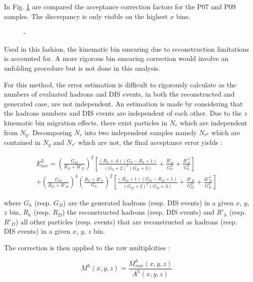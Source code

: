 In Fig. \ref{pic:AccPer} are compared the acceptance correction factors for the P07 and P09 samples. The discrepancy is only visible on the highest $x$ bins.

\begin{figure}
	\caption{-}
	\label{pic:AccPer}
\end{figure}

Used in this fashion, the kinematic bin smearing due to reconstruction limitations is accounted for. A more rigorous bin smearing correction would involve an unfolding procedure but is not done in this analysis.

For this method, the error estimation is difficult to rigorously calculate as the numbers of evaluated hadrons and DIS events, in both the reconstructed and generated case, are not independent. An estimation is made by considering that the hadrons numbers and DIS events are independent of each other. Due to the $z$ kinematic bin migration effects, there exist particles in $N_r$ which are independent from $N_g$. Decomposing $N_r$ into two independent samples namely $N_{r^0}$ which are contained in $N_g$ and $N_{r'}$ which are not, the final acceptance error yields :

\begin{equation}
  \begin{split}
    E^2_{acc} = \left (\frac{G_D}{R_D+R'_{D}}\right )^2\left [\frac{(R_h+A)(G_h-R_h+1)}{(G_h+2)^2(G_D+3)}+\frac{R'_{h}}{G^2_h}+\frac{R'^2_h}{G^3_h}\right ] \\
                + \left (\frac{G_D}{R_D+R'_{D}}\right )^4\left (\frac{R_h+R'_h}{G_h}\right )^2\left [\frac{(R_D+1)(G_D-R_D+1)}{(G_D+2)^2(G_D+3)}+\frac{R'_D}{G^2_D}+\frac{R'^2_D}{G^3_D}\right ]
  \end{split}
\end{equation}

where $G_h$ (resp. $G_D$) are the generated hadrons (resp. DIS events) in a given $x$, $y$, $z$ bin, $R_h$ (resp. $R_D$) the reconstructed hadrons (resp. DIS events) and $R'_h$ (resp. $R'_D$) all other particles (resp. events) that are reconstructed as hadrons (resp. DIS events) in a given $x$, $y$, $z$ bin.

The correction is then applied to the raw multiplcities :

\begin{equation}
  M^h(x,y,z) = \frac{M^h_{raw}(x,y,z)}{A^h(x,y,z)}
\end{equation}

